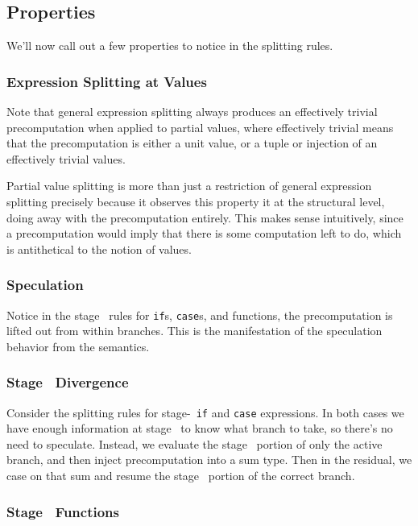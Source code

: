\subsection {Properties}

We'll now call out a few properties to notice in the splitting rules.

\subsubsection {Expression Splitting at Values}

Note that general expression splitting always produces an effectively trivial precomputation when applied to partial values,
where effectively trivial means that the precomputation is either a unit value, or a tuple or injection of an effectively trivial values.

Partial value splitting is more than just a restriction of general expression splitting 
precisely because it observes this property it at the structural level, doing away with the precomputation entirely.
This makes sense intuitively, since a precomputation would imply that there is some computation left to do, 
which is antithetical to the notion of values.

\subsubsection {Speculation}

Notice in the stage \bbtwo\ rules for {\tt if}s, {\tt case}s, and functions, the precomputation is lifted out from within branches.
This is the manifestation of the speculation behavior from the semantics.

\subsubsection {Stage \bbone\ Divergence}
Consider the splitting rules for stage-\bbone\ {\tt if} and {\tt case} expressions.
In both cases we have enough information at stage \bbone\ to know what branch to take, so there's no need to speculate.
Instead, we evaluate the stage \bbone\ portion of only the active branch, and then inject precomputation into a sum type.
Then in the residual, we case on that sum and resume the stage \bbtwo\ portion of the correct branch.

\subsubsection {Stage \bbone\ Functions}

